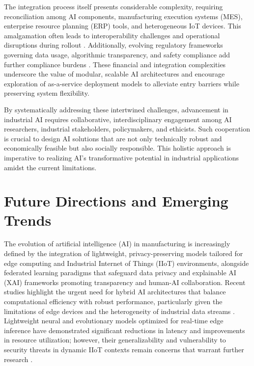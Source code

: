 \documentclass[sigconf]{acmart}
\begin{document}
The integration process itself presents considerable complexity, requiring reconciliation among AI components, manufacturing execution systems (MES), enterprise resource planning (ERP) tools, and heterogeneous IoT devices. This amalgamation often leads to interoperability challenges and operational disruptions during rollout \cite{ref6,ref44}. Additionally, evolving regulatory frameworks governing data usage, algorithmic transparency, and safety compliance add further compliance burdens \cite{ref2,ref13}. These financial and integration complexities underscore the value of modular, scalable AI architectures and encourage exploration of as-a-service deployment models to alleviate entry barriers while preserving system flexibility.

\vspace{1em}
By systematically addressing these intertwined challenges, advancement in industrial AI requires collaborative, interdisciplinary engagement among AI researchers, industrial stakeholders, policymakers, and ethicists. Such cooperation is crucial to design AI solutions that are not only technically robust and economically feasible but also socially responsible. This holistic approach is imperative to realizing AI’s transformative potential in industrial applications amidst the current limitations.

\section{Future Directions and Emerging Trends}

The evolution of artificial intelligence (AI) in manufacturing is increasingly defined by the integration of lightweight, privacy-preserving models tailored for edge computing and Industrial Internet of Things (IIoT) environments, alongside federated learning paradigms that safeguard data privacy and explainable AI (XAI) frameworks promoting transparency and human-AI collaboration. Recent studies highlight the urgent need for hybrid AI architectures that balance computational efficiency with robust performance, particularly given the limitations of edge devices and the heterogeneity of industrial data streams \cite{ref5,ref30}. Lightweight neural and evolutionary models optimized for real-time edge inference have demonstrated significant reductions in latency and improvements in resource utilization; however, their generalizability and vulnerability to security threats in dynamic IIoT contexts remain concerns that warrant further research \cite{ref31}.
\end{document}
